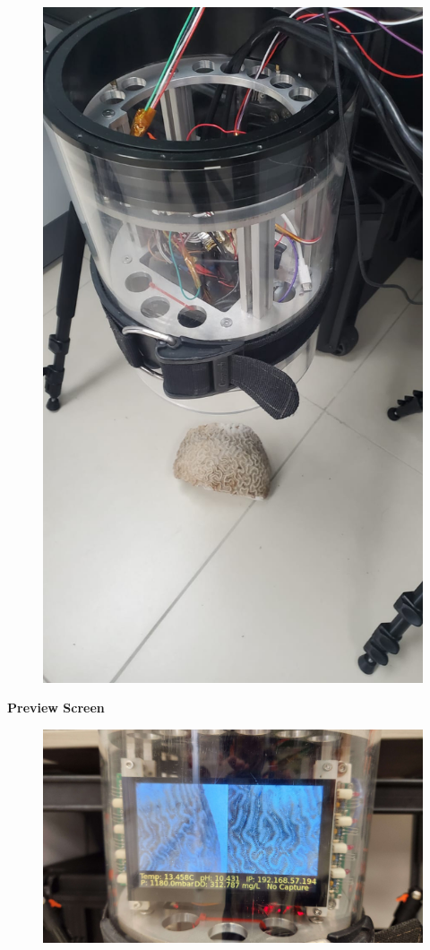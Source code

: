 \documentclass[17pt, aspectratio=169]{beamer}
\begin{document}
\begin{frame}
\begin{figure}
		\includegraphics[width=\textwidth, height=\textheight, keepaspectratio]{./Figures/MOSIS2.png}
	\end{figure}
\end{frame}
\begin{frame}
	\textbf{Preview Screen}
	\begin{figure}
		\includegraphics[width=\textwidth, height=\textheight, keepaspectratio]{./Figures/PreviewScreen.jpg}
	\end{figure}
\end{frame}
\end{document}
